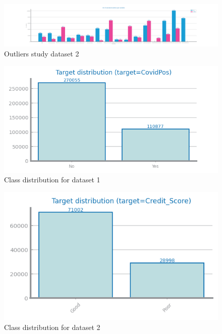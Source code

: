 \documentclass[10pt]{extarticle}
\begin{document}
\begin{figure}[H]
\centering\includegraphics[scale=0.40]{images/dataset2/data_profiling/Credit_Score_outliers_standard.png}
\caption{Outliers study dataset 2}
\end{figure}

\begin{figure}[H]
\centering\includegraphics[scale=0.95]{images/dataset1/data_profiling/CovidPos_class_distribution.png}
\caption{Class distribution for dataset 1}
\end{figure}

\begin{figure}[H]
\centering\includegraphics[scale=0.95]{images/dataset2/data_profiling/Credit_Score_class_distribution.png}
\caption{Class distribution for dataset 2}
\end{figure}
\end{document}

